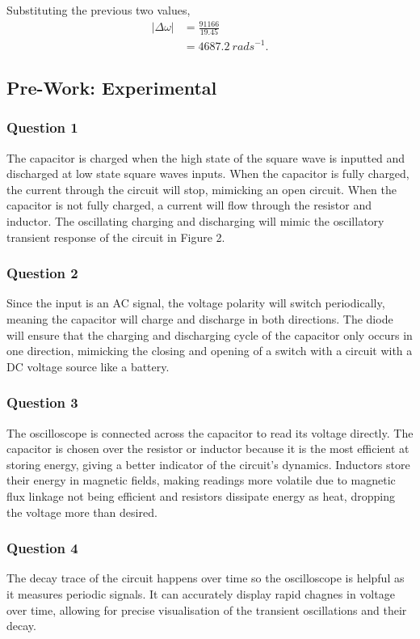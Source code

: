 \documentclass{article}
\begin{document}
Substituting the previous two values,
\begin{equation}
    \begin{split}
        |\Delta\omega| &= \frac{91166}{19.45} \\
        &= 4687.2 \: rads^{-1}.
    \end{split}
\end{equation}

\subsection{Pre-Work: Experimental}
\subsubsection{Question 1}
The capacitor is charged when the high state of the square wave is inputted
and discharged at low state square waves inputs. When the capacitor is fully
charged, the current through the circuit will stop, mimicking an open circuit.
When the capacitor is not fully charged, a current will flow through the resistor
and inductor. The oscillating charging and discharging will mimic the oscillatory
transient response of the circuit in Figure 2.

\subsubsection{Question 2}
Since the input is an AC signal, the voltage polarity will switch periodically, 
meaning the capacitor will charge and discharge in both directions. The diode 
will ensure that the charging and discharging cycle of the capacitor only occurs 
in one direction, mimicking the closing and opening of a switch with a circuit
with a DC voltage source like a battery.

\subsubsection{Question 3}
The oscilloscope is connected across the capacitor to read its voltage directly.
The capacitor is chosen over the resistor or inductor because it is the most 
efficient at storing energy, giving a better indicator of the circuit's dynamics.
Inductors store their energy in magnetic fields, making readings more volatile due to
magnetic flux linkage not being efficient and resistors dissipate energy as heat, 
dropping the voltage more than desired.

\subsubsection{Question 4}
The decay trace of the circuit happens over time so the oscilloscope is helpful as 
it measures periodic signals. It can accurately display rapid chagnes in voltage 
over time, allowing for precise visualisation of the transient oscillations and their
decay.
\end{document}
